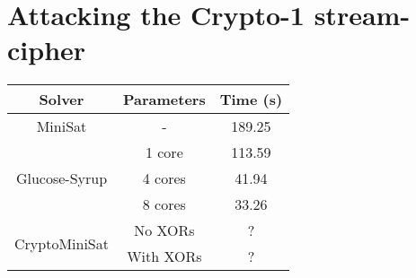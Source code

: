\section{Attacking the Crypto-1 stream-cipher}
\begin{tabular}{|c|c|c|}
	\hline
	\textbf{Solver} & \textbf{Parameters} & \textbf{Time (s)} \\
	\hline
	MiniSat & - & 189.25 \\
	\hline
	\multirow{3}{*}{Glucose-Syrup} & 1 core & 113.59 \\ \cline{2-3}
	 & 4 cores & 41.94 \\ \cline{2-3}
	 & 8 cores & 33.26 \\
	 \hline
	 
	 \multirow{2}{*}{CryptoMiniSat} & No {XORs} & ? \\ \cline{2-3}
	 & With {XORs} & ? \\ \cline{2-3}
	 \hline
\end{tabular}